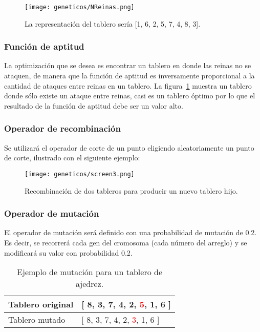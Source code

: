 \begin{figure}[H]
  \centering
  \texttt{[image: geneticos/NReinas.png]}
  \caption{La representación del tablero sería [1, 6, 2, 5, 7, 4, 8, 3].}
  \label{fig:P8screen2}
\end{figure}


\subsubsection{Funci\'on de aptitud}\par

La optimización que se desea es encontrar un tablero en donde las reinas no se ataquen, de manera que la función de aptitud es inversamente proporcional a la cantidad de ataques entre reinas en un tablero.
La figura~\ref{fig:P8screen2} muestra un tablero donde sólo existe un ataque entre reinas, casi es un tablero óptimo por lo que el resultado de la función de aptitud debe ser un valor alto.

\subsubsection{Operador de recombinaci\'on}

Se utilizará el operador de corte de un punto eligiendo aleatoriamente un punto de corte, ilustrado con el siguiente ejemplo:

\begin{figure}[H]
  \centering
  \texttt{[image: geneticos/screen3.png]}
  \caption{Recombinación de dos tableros para producir un nuevo tablero hijo.}
\end{figure}


\subsubsection{Operador de mutaci\'on}

El operador de mutación será definido con una probabilidad de mutación de 0.2. Es decir, se recorrerá cada gen del cromosoma (cada número del arreglo) y se modificará su valor con probabilidad 0.2.

\begin{table}[H]
  \centering
  \begin{tabular}{|l|l|}
  \hline
  Tablero original & {[} 8, 3, 7, 4, 2, \textcolor{red}{5}, 1, 6 {]}  \\ \hline
  Tablero mutado   & {[} 8, 3, 7, 4, 2, \textcolor{red}{3}, 1, 6 {]}  \\ \hline
  \end{tabular}
  \caption{Ejemplo de mutación para un tablero de ajedrez.}
\end{table}

